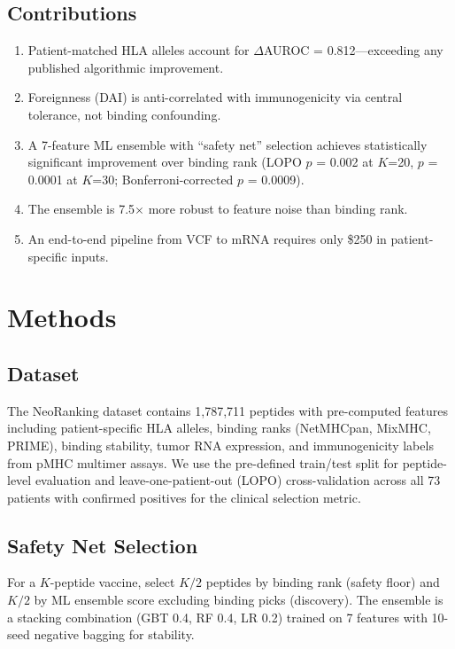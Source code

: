 \documentclass[11pt,twocolumn]{article}
\begin{document}
\subsection{Contributions}

\begin{enumerate}[leftmargin=*,topsep=0pt,itemsep=2pt]
\item Patient-matched HLA alleles account for $\Delta$AUROC = 0.812---exceeding any published algorithmic improvement.
\item Foreignness (DAI) is anti-correlated with immunogenicity via central tolerance, not binding confounding.
\item A 7-feature ML ensemble with ``safety net'' selection achieves statistically significant improvement over binding rank (LOPO $p$ = 0.002 at $K$=20, $p$ = 0.0001 at $K$=30; Bonferroni-corrected $p$ = 0.0009).
\item The ensemble is 7.5$\times$ more robust to feature noise than binding rank.
\item An end-to-end pipeline from VCF to mRNA requires only \$250 in patient-specific inputs.
\end{enumerate}

\section{Methods}

\subsection{Dataset}

The NeoRanking dataset contains 1,787,711 peptides with pre-computed features including patient-specific HLA alleles, binding ranks (NetMHCpan, MixMHC, PRIME), binding stability, tumor RNA expression, and immunogenicity labels from pMHC multimer assays. We use the pre-defined train/test split for peptide-level evaluation and leave-one-patient-out (LOPO) cross-validation across all 73 patients with confirmed positives for the clinical selection metric.

\subsection{Safety Net Selection}

For a $K$-peptide vaccine, select $K/2$ peptides by binding rank (safety floor) and $K/2$ by ML ensemble score excluding binding picks (discovery). The ensemble is a stacking combination (GBT 0.4, RF 0.4, LR 0.2) trained on 7 features with 10-seed negative bagging for stability.
\end{document}
